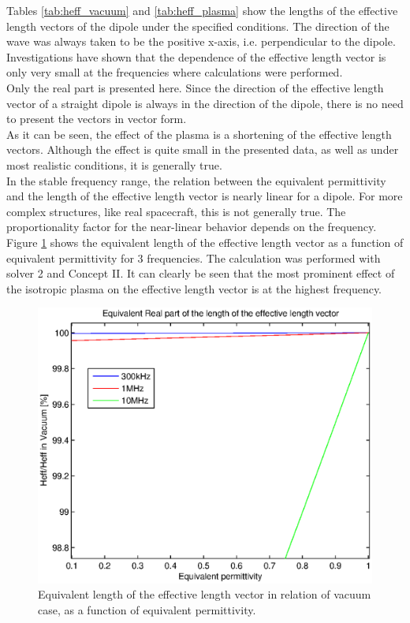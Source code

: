 \documentclass[a4paper,11pt]{article}
\begin{document}
Tables \ref{tab:heff_vacuum} and \ref{tab:heff_plasma} show the lengths of the effective length vectors of the dipole under the specified conditions. The direction of the wave was always taken to be the positive x-axis, i.e. perpendicular to the dipole. Investigations have shown that the dependence of the effective length vector is only very small at the frequencies where calculations were performed.\\

Only the real part is presented here. Since the direction of the effective length vector of a straight dipole is always in the direction of the dipole, there is no need to present the vectors in vector form.\\

As it can be seen, the effect of the plasma is a shortening of the effective length vectors. Although the effect is quite small in the presented data, as well as under most realistic conditions, it is generally true.\\

In the stable frequency range, the relation between the equivalent permittivity and the length of the effective length vector is nearly linear for a dipole. For more complex structures, like real spacecraft, this is not generally true. The proportionality factor for the near-linear behavior depends on the frequency. Figure \ref{fig:relative_heff_shortening} shows the equivalent length of the effective length vector as a function of equivalent permittivity for 3 frequencies. The calculation was performed with solver 2 and Concept II. It can clearly be seen that the most prominent effect of the isotropic plasma on the effective length vector is at the highest frequency.\\

\begin{figure}
  \includegraphics[width=12cm]{heff_shortening_dipole.eps}
\caption{Equivalent length of the effective length vector in relation of vacuum case, as a function of equivalent permittivity.}
\label{fig:relative_heff_shortening}
\end{figure}
\end{document}

